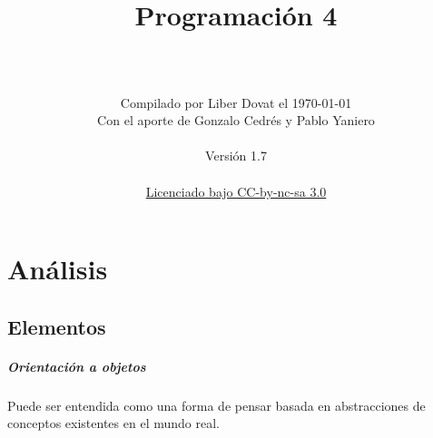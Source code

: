 \documentclass[a4paper,12pt,oneside]{report}
\begin{document}

  \title{
    \begin{flushright}
      \Huge  Programaci\'on 4\\
      \LARGE {}
    \end{flushright}
  } %

  \author{\vspace{5cm}
    \\
    \normalsize
    \begin{tabular}{c}
      Compilado por Liber Dovat el \today\\
      Con el aporte de Gonzalo Cedr\'es y Pablo Yaniero\\
      \\
      Versi\'on 1.7\\
      \\
      \href{http://creativecommons.org/licenses/by-nc-sa/3.0/deed.es_CL}{Licenciado bajo CC-by-nc-sa 3.0}
    \end{tabular}
  } %

  \date{}
  \maketitle

  \newpage


  \tableofcontents
  \thispagestyle{plain}

  \newpage




  \chapter{An\'alisis}
  \thispagestyle{contenido} %
  \pagestyle{contenido}     %

    \section{Elementos}
        \paragraph{Orientaci\'on a objetos}
          Puede ser entendida como una forma de pensar basada en abstracciones de conceptos existentes en el mundo real.
\end{document}
